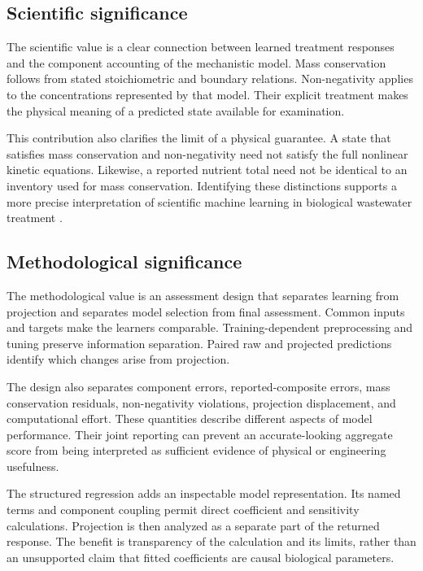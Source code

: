 \subsection{Scientific significance}

The scientific value is a clear connection between learned treatment responses and the component accounting of the mechanistic model. Mass conservation follows from stated stoichiometric and boundary relations. Non-negativity applies to the concentrations represented by that model. Their explicit treatment makes the physical meaning of a predicted state available for examination.

This contribution also clarifies the limit of a physical guarantee. A state that satisfies mass conservation and non-negativity need not satisfy the full nonlinear kinetic equations. Likewise, a reported nutrient total need not be identical to an inventory used for mass conservation. Identifying these distinctions supports a more precise interpretation of scientific machine learning in biological wastewater treatment \citep{Henze2006,TakacsVanrolleghem2006}.

\subsection{Methodological significance}

The methodological value is an assessment design that separates learning from projection and separates model selection from final assessment. Common inputs and targets make the learners comparable. Training-dependent preprocessing and tuning preserve information separation. Paired raw and projected predictions identify which changes arise from projection.

The design also separates component errors, reported-composite errors, mass conservation residuals, non-negativity violations, projection displacement, and computational effort. These quantities describe different aspects of model performance. Their joint reporting can prevent an accurate-looking aggregate score from being interpreted as sufficient evidence of physical or engineering usefulness.

The structured regression adds an inspectable model representation. Its named terms and component coupling permit direct coefficient and sensitivity calculations. Projection is then analyzed as a separate part of the returned response. The benefit is transparency of the calculation and its limits, rather than an unsupported claim that fitted coefficients are causal biological parameters.

